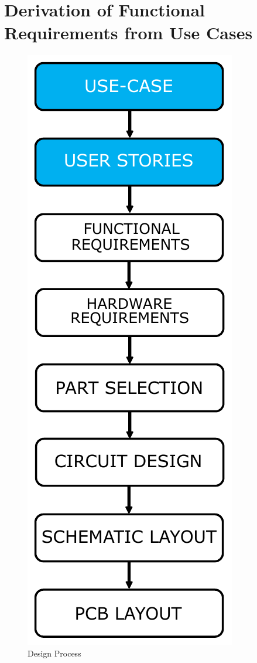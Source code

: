 \chapter{Derivation of Functional Requirements from Use Cases} %

\label{Chapter3} %

\begin{figure}
	\includegraphics[width=0.5\linewidth]{Figures/usecases.pdf}\centering
	\caption{Design Process}
	\label{fig:methodology}
\end{figure}

%
%

